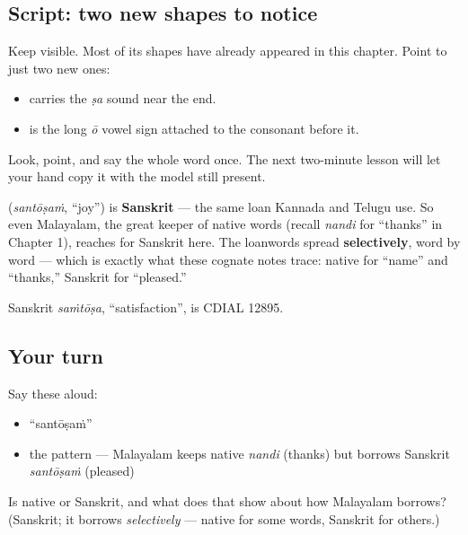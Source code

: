 \subsection*{Script: two new shapes to notice}
Keep \textbf{} visible. Most of its shapes have already appeared in this chapter. Point to just two new ones:

\begin{itemize}
\raggedright
  \item \textbf{} carries the \emph{ṣa} sound near the end.
  \item \textbf{} is the long \emph{ō} vowel sign attached to the consonant before it.
\end{itemize}

Look, point, and say the whole word once. The next two-minute lesson will let your hand copy it with the model still present.

\begin{cousinweb}
\textbf{} (\emph{santōṣaṁ}, \textquotedblleft{}joy\textquotedblright{}) is \textbf{Sanskrit} — the same loan Kannada and Telugu use. So even Malayalam, the great keeper of native words (recall \emph{nandi} for \textquotedblleft{}thanks\textquotedblright{} in Chapter 1), reaches for Sanskrit here. The loanwords spread \textbf{selectively}, word by word — which is exactly what these cognate notes trace: native for \textquotedblleft{}name\textquotedblright{} and \textquotedblleft{}thanks,\textquotedblright{} Sanskrit for \textquotedblleft{}pleased.\textquotedblright{}

Sanskrit \emph{saṁtōṣa}, \textquotedblleft{}satisfaction\textquotedblright{}, is CDIAL 12895.
\end{cousinweb}

\subsection*{Your turn}
Say these aloud:

\begin{itemize}
\raggedright
  \item \textquotedblleft{}santōṣaṁ\textquotedblright{}
  \item the pattern — Malayalam keeps native \emph{nandi} (thanks) but borrows Sanskrit \emph{santōṣaṁ} (pleased)
\end{itemize}

\begin{tcolorbox}[breakable,colback=teal!4,colframe=teal!35!black,title={Before you move on}]
Is \textbf{} native or Sanskrit, and what does that show about how Malayalam borrows? (Sanskrit; it borrows \emph{selectively} — native for some words, Sanskrit for others.)
\end{tcolorbox}
